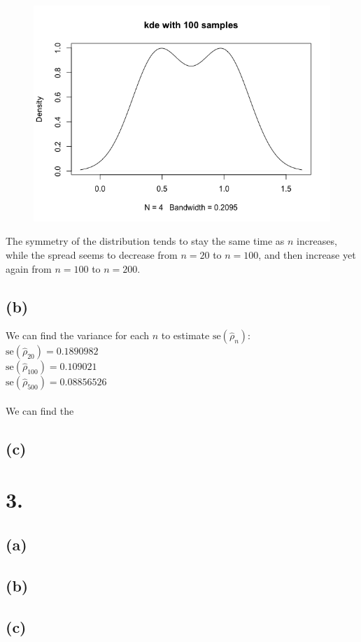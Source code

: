 \documentclass{article}
\begin{document}
{\begin{figure}[h!]
  \centering
  \includegraphics[width=500pt]{hw5_2a_100.png}
\end{figure}
The symmetry of the distribution tends to stay the same time as $n$ increases, while the spread seems to decrease from $n = 20$ to $n = 100$, and then increase yet again from $n = 100$ to $n = 200$.

\subsection*{(b)}

We can find the variance for each $n$ to estimate $\text{se}(\hat{\rho}_n)$: \\
$\text{se}(\hat{\rho}_20) = 0.1890982$ \\
$\text{se}(\hat{\rho}_100) = 0.109021$ \\
$\text{se}(\hat{\rho}_500) = 0.08856526$ \\ \\
We can find the 

\subsection*{(c)}


}

\section*{3.}
{\Large

\subsection*{(a)}



\subsection*{(b)}



\subsection*{(c)}


}
\end{document}
